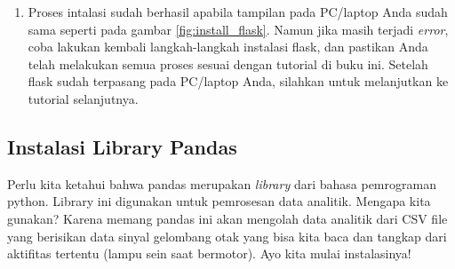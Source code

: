 \begin{enumerate}
\item Proses intalasi sudah berhasil apabila tampilan pada PC/laptop Anda sudah sama seperti pada gambar \ref{fig:install_flask}. Namun jika masih terjadi \textit{error}, coba lakukan kembali langkah-langkah instalasi flask, dan pastikan Anda telah melakukan semua proses sesuai dengan tutorial di buku ini. Setelah flask sudah terpasang pada PC/laptop Anda, silahkan untuk melanjutkan ke tutorial selanjutnya.
\end{enumerate}

\subsection{Instalasi Library Pandas}

Perlu kita ketahui bahwa pandas merupakan \textit{library} dari bahasa pemrograman python. Library ini digunakan untuk pemrosesan data analitik. Mengapa kita gunakan? Karena memang pandas ini akan mengolah data analitik dari CSV file yang berisikan data sinyal gelombang otak yang bisa kita baca dan tangkap dari aktifitas tertentu (lampu sein saat bermotor). Ayo kita mulai instalasinya!
